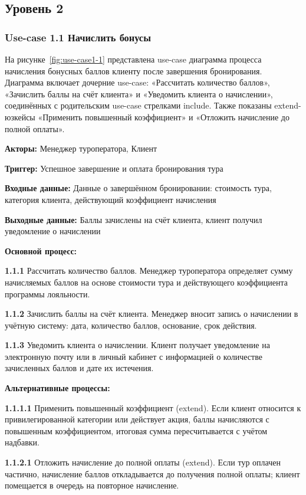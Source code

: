 \documentclass[11pt,a4paper,final]{article}
\begin{document}
\subsection{Уровень 2}

\subsubsection{Use-case 1.1 Начислить бонусы}

На рисунке~\ref{fig:use-case1-1} представлена use-case диаграмма процесса начисления бонусных баллов клиенту после завершения бронирования. Диаграмма включает дочерние use-case: «Рассчитать количество баллов», «Зачислить баллы на счёт клиента» и «Уведомить клиента о начислении», соединённых с родительским use-case стрелками include. Также показаны extend-юзкейсы «Применить повышенный коэффициент» и «Отложить начисление до полной оплаты».

\textbf{Акторы:} Менеджер туроператора, Клиент

\textbf{Триггер:} Успешное завершение и оплата бронирования тура

\textbf{Входные данные:} Данные о завершённом бронировании: стоимость тура, категория клиента, действующий коэффициент начисления

\textbf{Выходные данные:} Баллы зачислены на счёт клиента, клиент получил уведомление о начислении

\textbf{Основной процесс:}

\textbf{1.1.1} Рассчитать количество баллов. Менеджер туроператора определяет сумму начисляемых баллов на основе стоимости тура и действующего коэффициента программы лояльности.

\textbf{1.1.2} Зачислить баллы на счёт клиента. Менеджер вносит запись о начислении в учётную систему: дата, количество баллов, основание, срок действия.

\textbf{1.1.3} Уведомить клиента о начислении. Клиент получает уведомление на электронную почту или в личный кабинет с информацией о количестве зачисленных баллов и дате их истечения.

\textbf{Альтернативные процессы:}

\textbf{1.1.1.1} Применить повышенный коэффициент (extend). Если клиент относится к привилегированной категории или действует акция, баллы начисляются с повышенным коэффициентом, итоговая сумма пересчитывается с учётом надбавки.

\textbf{1.1.2.1} Отложить начисление до полной оплаты (extend). Если тур оплачен частично, начисление баллов откладывается до получения полной оплаты; клиент помещается в очередь на повторное начисление.
\end{document}
